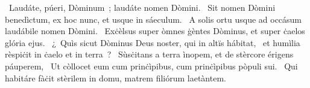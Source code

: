 \psalmChapterWithInscription{}
{ }
{%
~Laudáte, púeri, Dòminum~; laudáte nomen Dòmini. 
~Sit nomen Dòmini benedìctum, ex hoc nunc, et usque in sáeculum. 
~A solis ortu usque ad occásum laudábile nomen Dòmini. 
~Exċèlsus super òmnes ġèntes Dòminus, et super ċaelos glória ejus. 
~¿~Quìs sicut Dòminus Deus noster, qui in altïs hábitat, 
~et humìlia rèspiċit in ċaelo et in terra~? 
~Sùsċitans a terra ìnopem, et de stèrcore érigens páuperem, 
~Ut còllocet eum cum prinċìpibus, cum prinċìpibus pòpuli sui. 
~Qui habitáre fàċit stèrilem in domu, matrem filiórum laetàntem. 
}
